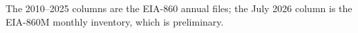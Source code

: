 \footnotesize The 2010--2025 columns are the EIA-860 annual files; the July 2026 column is the EIA-860M monthly inventory, which is preliminary.
